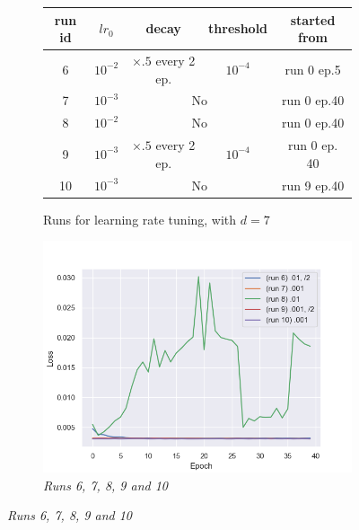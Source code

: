 \documentclass{article}
\begin{document}
        \begin{figure}[!ht]
            \begin{subfigure}{.6\linewidth}
                \begin{tabular}{|c|c|c|c|c|}
                    \hline
                    run id & $lr_0$ & decay & threshold & started from\\
                    \hline
                    \hline
                    6 & $10^{-2}$ & $\times .5$ every 2 ep. & $10^{-4}$ & run 0 ep.5 \\
                    \hline
                    7 & $10^{-3}$ & \multicolumn{2}{|c|}{No} & run 0 ep.40 \\
                    \hline
                    8 & $10^{-2}$ & \multicolumn{2}{|c|}{No} & run 0 ep.40 \\
                    \hline
                    9 & $10^{-3}$ & $\times .5$ every 2 ep. & $10^{-4}$ & run 0 ep. 40 \\
                    \hline
                    10 & $10^{-3}$ & \multicolumn{2}{|c|}{No} & run 9 ep.40\\
                    \hline
                \end{tabular}
                \caption{Runs for learning rate tuning, with $d=7$}
            \end{subfigure}
            \begin{subfigure}{.39\linewidth}
                \centering
                \includegraphics[width=\linewidth]{pics/hpp-lr-loss-678910.png}
                \caption{\textit{Runs 6, 7, 8, 9 and 10}}
                \label{fig:hpp-lr-div}

\end{subfigure}
\end{figure}
\end{document}
